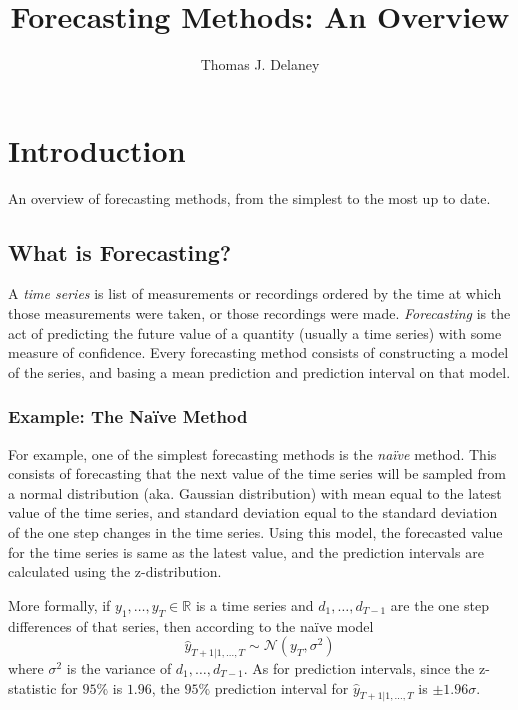\documentclass[a4paper,12pt]{article}
\title{Forecasting Methods: An Overview}
\date{}
\author{Thomas J. Delaney}
\theoremstyle{definition}
\begin{document}
\maketitle

\tableofcontents

\newpage

\section{Introduction}
An overview of forecasting methods, from the simplest to the most up to date.

\subsection{What is Forecasting?}
A \textit{time series} is list of measurements or recordings ordered by the time at which those measurements were taken, or those recordings were made. \textit{Forecasting} is the act of predicting the future value of a quantity (usually a time series) with some measure of confidence. Every forecasting method consists of constructing a model of the series, and basing a mean prediction and prediction interval on that model. 

\subsubsection{Example: The Na\"{i}ve Method}\label{sec:naive_method}
For example, one of the simplest forecasting methods is the \textit{na\"{i}ve} method. This consists of forecasting that the next value of the time series will be sampled from a normal distribution (aka. Gaussian distribution) with mean equal to the latest value of the time series, and standard deviation equal to the standard deviation of the one step changes in the time series. Using this model, the forecasted value for the time series is same as the latest value, and the prediction intervals are calculated using the z-distribution.

More formally, if $y_1, \dots, y_T \in \mathbb{R}$ is a time series and $d_1, \dots, d_{T-1}$ are the one step differences of that series, then according to the na\"{i}ve model 
\begin{equation}\label{eq:naive_method}
	\hat{y}_{T+1 | 1, \dots, T} \sim \mathcal{N}(y_T, \sigma^2)
\end{equation}
where $\sigma^2$ is the variance of $d_1, \dots, d_{T-1}$. As for prediction intervals, since the z-statistic for $95\%$ is $1.96$, the $95\%$ prediction interval for $\hat{y}_{T+1 | 1, \dots, T}$ is $\pm1.96\sigma$.
\end{document}
